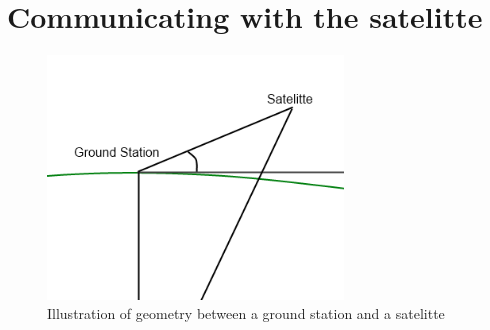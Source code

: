 \section{Communicating with the satelitte}

\begin{figure}
	\begin{center}
		\includegraphics[width=0.7\textwidth]{Figures/groundstation_satelitte_geometry}
	\end{center}
\caption[Ground station satellite geometry]{Illustration of geometry between a ground station and a satelitte}
\end{figure}
